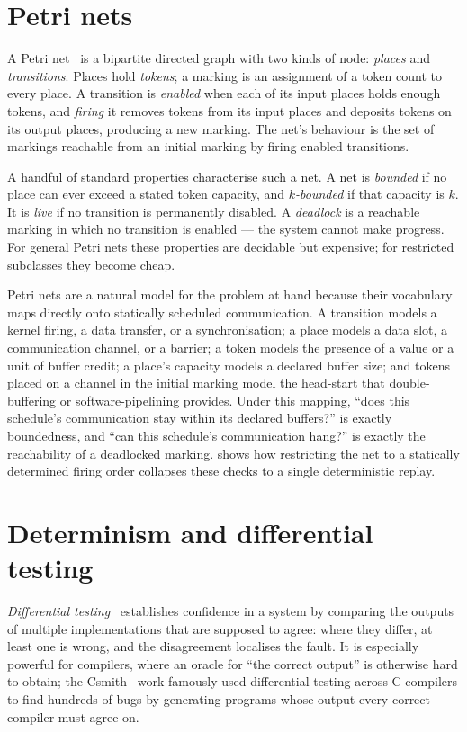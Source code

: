 \section{Petri nets}\label{sec:bg-petri}

A Petri net~\cite{petri1962kommunikation,murata1989petri} is a bipartite
directed graph with two kinds of node: \emph{places} and \emph{transitions}.
Places hold \emph{tokens}; a marking is an assignment of a token count to every
place. A transition is \emph{enabled} when each of its input places holds enough
tokens, and \emph{firing} it removes tokens from its input places and deposits
tokens on its output places, producing a new marking. The net's behaviour is the
set of markings reachable from an initial marking by firing enabled transitions.

A handful of standard properties characterise such a net. A net is
\emph{bounded} if no place can ever exceed a stated token capacity, and
\emph{$k$-bounded} if that capacity is $k$. It is \emph{live} if no transition is
permanently disabled. A \emph{deadlock} is a reachable marking in which no
transition is enabled --- the system cannot make progress. For general Petri
nets these properties are decidable but expensive; for restricted subclasses
they become cheap.

Petri nets are a natural model for the problem at hand because their vocabulary
maps directly onto statically scheduled communication. A transition models a
kernel firing, a data transfer, or a synchronisation; a place models a data
slot, a communication channel, or a barrier; a token models the presence of a
value or a unit of buffer credit; a place's capacity models a declared buffer
size; and tokens placed on a channel in the initial marking model the
head-start that double-buffering or software-pipelining provides. Under this
mapping, ``does this schedule's communication stay within its declared
buffers?'' is exactly boundedness, and ``can this schedule's communication
hang?'' is exactly the reachability of a deadlocked marking.
 shows how restricting the net to a statically determined
firing order collapses these checks to a single deterministic replay.

\section{Determinism and differential testing}\label{sec:bg-determinism}

\emph{Differential testing}~\cite{mckeeman1998differential} establishes
confidence in a system by comparing the outputs of multiple implementations that
are supposed to agree: where they differ, at least one is wrong, and the
disagreement localises the fault. It is especially powerful for compilers, where
an oracle for ``the correct output'' is otherwise hard to obtain; the
Csmith~\cite{yang2011csmith} work famously used differential testing across C
compilers to find hundreds of bugs by generating programs whose output every
correct compiler must agree on.

